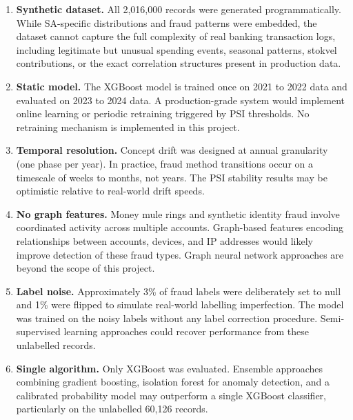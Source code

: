 \documentclass[12pt, a4paper]{article}
\begin{document}
\begin{enumerate}[leftmargin=1.5cm]

    \item \textbf{Synthetic dataset.} All 2,016,000 records were generated programmatically. While SA-specific distributions and fraud patterns were embedded, the dataset cannot capture the full complexity of real banking transaction logs, including legitimate but unusual spending events, seasonal patterns, stokvel contributions, or the exact correlation structures present in production data.

    \item \textbf{Static model.} The XGBoost model is trained once on 2021 to 2022 data and evaluated on 2023 to 2024 data. A production-grade system would implement online learning or periodic retraining triggered by PSI thresholds. No retraining mechanism is implemented in this project.

    \item \textbf{Temporal resolution.} Concept drift was designed at annual granularity (one phase per year). In practice, fraud method transitions occur on a timescale of weeks to months, not years. The PSI stability results may be optimistic relative to real-world drift speeds.

    \item \textbf{No graph features.} Money mule rings and synthetic identity fraud involve coordinated activity across multiple accounts. Graph-based features encoding relationships between accounts, devices, and IP addresses would likely improve detection of these fraud types. Graph neural network approaches are beyond the scope of this project.

    \item \textbf{Label noise.} Approximately 3\% of fraud labels were deliberately set to null and 1\% were flipped to simulate real-world labelling imperfection. The model was trained on the noisy labels without any label correction procedure. Semi-supervised learning approaches could recover performance from these unlabelled records.

    \item \textbf{Single algorithm.} Only XGBoost was evaluated. Ensemble approaches combining gradient boosting, isolation forest for anomaly detection, and a calibrated probability model may outperform a single XGBoost classifier, particularly on the unlabelled 60,126 records.

\end{enumerate}
\end{document}

